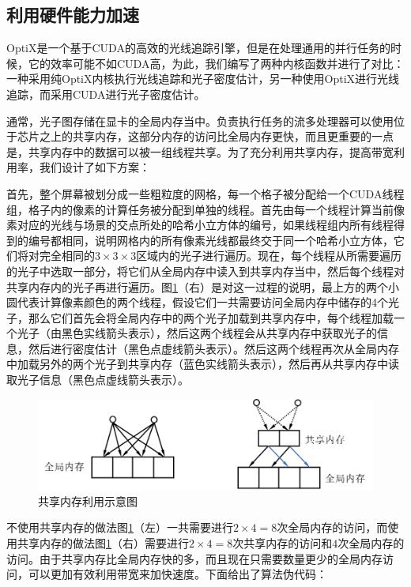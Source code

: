 \documentclass[UTF8]{ctexart}
\begin{document}
    \subsection{利用硬件能力加速}
    OptiX\cite{2010OptiX}是一个基于CUDA的高效的光线追踪引擎，但是在处理通用的并行任务的时候，它的效率可能不如CUDA高，为此，我们编写了两种内核函数并进行了对比：一种采用纯OptiX内核执行光线追踪和光子密度估计，另一种使用OptiX进行光线追踪，而采用CUDA进行光子密度估计。
    
    通常，光子图存储在显卡的全局内存当中。负责执行任务的流多处理器可以使用位于芯片之上的共享内存，这部分内存的访问比全局内存更快，而且更重要的一点是，共享内存中的数据可以被一组线程共享。为了充分利用共享内存，提高带宽利用率，我们设计了如下方案：
    
    首先，整个屏幕被划分成一些粗粒度的网格，每一个格子被分配给一个CUDA线程组，格子内的像素的计算任务被分配到单独的线程。首先由每一个线程计算当前像素对应的光线与场景的交点所处的哈希小立方体的编号，如果线程组内所有线程得到的编号都相同，说明网格内的所有像素光线都最终交于同一个哈希小立方体，它们将对完全相同的$3\times3\times3$区域内的光子进行遍历。现在，每个线程从所需要遍历的光子中选取一部分，将它们从全局内存中读入到共享内存当中，然后每个线程对共享内存内的光子再进行遍历。图\ref{fig:5}（右）是对这一过程的说明，最上方的两个小圆代表计算像素颜色的两个线程，假设它们一共需要访问全局内存中储存的4个光子，那么它们首先会将全局内存中的两个光子加载到共享内存中，每个线程加载一个光子（由黑色实线箭头表示），然后这两个线程会从共享内存中获取光子的信息，然后进行密度估计（黑色点虚线箭头表示）。然后这两个线程再次从全局内存中加载另外的两个光子到共享内存（蓝色实线箭头表示），然后再从共享内存中读取光子信息（黑色点虚线箭头表示）。
    
    \begin{figure}[htbp]
    \centering
    \includegraphics[scale=0.7]{pic/SharedMemory.png}
    \caption{共享内存利用示意图}
    \label{fig:5}
    \end{figure}
    
    不使用共享内存的做法图\ref{fig:5}（左）一共需要进行$2\times4=8$次全局内存的访问，而使用共享内存的做法图\ref{fig:5}（右）需要进行$2\times4=8$次共享内存的访问和$4$次全局内存的访问。由于共享内存比全局内存快的多，而且现在只需要数量更少的全局内存访问，可以更加有效利用带宽来加快速度。下面给出了算法伪代码：
    
\end{document}

